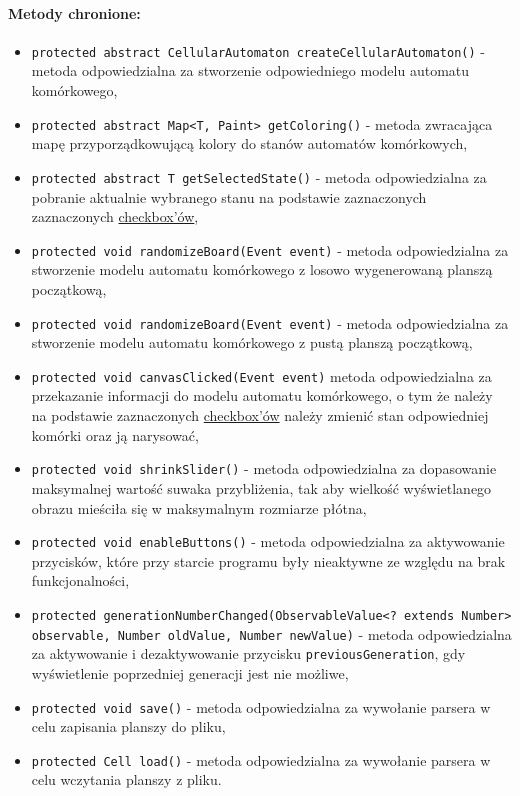\documentclass{report}
\begin{document}
\paragraph{Metody chronione:}
\begin{itemize}
	\item \texttt{protected abstract CellularAutomaton createCellularAutomaton()} - metoda odpowiedzialna za stworzenie odpowiedniego modelu automatu komórkowego,
	\item \texttt{protected abstract Map<T, Paint> getColoring()} - metoda zwracająca mapę przyporządkowującą kolory do stanów automatów komórkowych,
	\item \texttt{protected abstract T getSelectedState()} - metoda odpowiedzialna za pobranie aktualnie wybranego stanu na podstawie zaznaczonych  zaznaczonych \hyperref[sec:checkbox]{checkbox'ów}, 
	\item \texttt{protected void randomizeBoard(Event event)} - metoda odpowiedzialna za stworzenie modelu automatu komórkowego z losowo wygenerowaną planszą początkową,
	\item \texttt{protected void randomizeBoard(Event event)} - metoda odpowiedzialna za stworzenie modelu automatu komórkowego z pustą planszą początkową,
	\item \texttt{protected void canvasClicked(Event event)} metoda odpowiedzialna za przekazanie informacji do modelu automatu komórkowego, o tym że należy na podstawie zaznaczonych \hyperref[sec:checkbox]{checkbox'ów} należy zmienić stan odpowiedniej komórki oraz ją narysować,
 	\item \texttt{protected void shrinkSlider()} - metoda odpowiedzialna za dopasowanie maksymalnej wartość suwaka przybliżenia, tak aby 		wielkość wyświetlanego obrazu mieściła się w maksymalnym rozmiarze płótna,
 	\item \texttt{protected void enableButtons()} - metoda odpowiedzialna za aktywowanie przycisków, które przy starcie programu były 			nieaktywne ze względu na brak funkcjonalności,
 	\item \texttt{protected generationNumberChanged(ObservableValue<? extends Number> observable, Number oldValue, Number newValue)} - metoda odpowiedzialna za aktywowanie i dezaktywowanie przycisku 							\texttt{previousGeneration}, gdy wyświetlenie poprzedniej generacji jest nie możliwe,
 	\item \texttt{protected void save()} - metoda odpowiedzialna za wywołanie parsera w celu zapisania planszy do pliku,
	\item \texttt{protected Cell load()} - metoda odpowiedzialna za wywołanie parsera w celu wczytania planszy z pliku.
\end{itemize}
\end{document}
